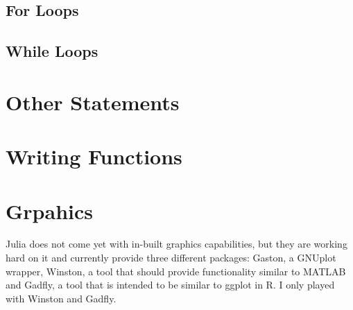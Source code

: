 \subsection{For Loops}

\subsection{While Loops}

\section{Other Statements}


\newpage
\section{Writing Functions}


\section{Grpahics}
Julia does not come yet with in-built graphics capabilities, but they are working hard on it and currently provide three different packages: Gaston, a GNUplot wrapper, Winston, a tool that should provide functionality similar to MATLAB and Gadfly, a tool that is intended to be similar to ggplot in R. I only played with Winston and Gadfly. 
